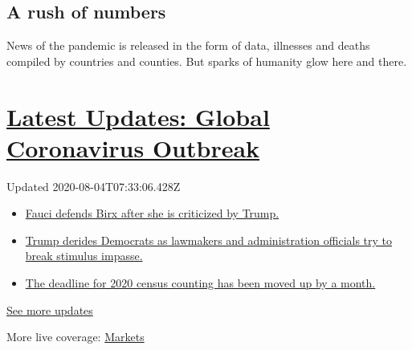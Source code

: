 \hypertarget{a-rush-of-numbers}{%
\subsection{A rush of numbers}\label{a-rush-of-numbers}}

News of the pandemic is released in the form of data, illnesses and
deaths compiled by countries and counties. But sparks of humanity glow
here and there.

\hypertarget{latest-updates-global-coronavirus-outbreak}{%
\section{\texorpdfstring{\href{https://www.nytimes.com/2020/08/03/world/coronavirus-covid-19.html?action=click\&pgtype=Article\&state=default\&region=MAIN_CONTENT_1\&context=storylines_live_updates}{Latest
Updates: Global Coronavirus
Outbreak}}{Latest Updates: Global Coronavirus Outbreak}}\label{latest-updates-global-coronavirus-outbreak}}

Updated 2020-08-04T07:33:06.428Z

\begin{itemize}
\tightlist
\item
  \href{https://www.nytimes.com/2020/08/03/world/coronavirus-covid-19.html?action=click\&pgtype=Article\&state=default\&region=MAIN_CONTENT_1\&context=storylines_live_updates\#link-4547638f}{Fauci
  defends Birx after she is criticized by Trump.}
\item
  \href{https://www.nytimes.com/2020/08/03/world/coronavirus-covid-19.html?action=click\&pgtype=Article\&state=default\&region=MAIN_CONTENT_1\&context=storylines_live_updates\#link-15e7f995}{Trump
  derides Democrats as lawmakers and administration officials try to
  break stimulus impasse.}
\item
  \href{https://www.nytimes.com/2020/08/03/world/coronavirus-covid-19.html?action=click\&pgtype=Article\&state=default\&region=MAIN_CONTENT_1\&context=storylines_live_updates\#link-e5a2cda}{The
  deadline for 2020 census counting has been moved up by a month.}
\end{itemize}

\href{https://www.nytimes.com/2020/08/03/world/coronavirus-covid-19.html?action=click\&pgtype=Article\&state=default\&region=MAIN_CONTENT_1\&context=storylines_live_updates}{See
more updates}

More live coverage:
\href{https://www.nytimes.com/live/2020/08/03/business/stock-market-today-coronavirus?action=click\&pgtype=Article\&state=default\&region=MAIN_CONTENT_1\&context=storylines_live_updates}{Markets}

